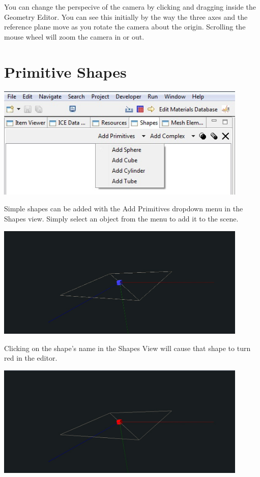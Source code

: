 You can change the perspecive of the camera by clicking and dragging inside the
Geometry Editor. You can see this initially by the way the three axes and the
reference plane move as you rotate the camera about the origin. Scrolling the
mouse wheel will zoom the camera in or out.

\section{Primitive Shapes}

\begin{center}
\includegraphics[width=12cm]{images/GeometryAddPrimitive.jpg}
\end{center}

Simple shapes can be added with the Add Primitives dropdown menu in the Shapes
view. Simply select an object from the menu to add it to the scene.

\begin{center}
\includegraphics[width=12cm]{images/GeometryAddCube.jpg}
\end{center}

Clicking on the shape's name in the Shapes View will cause that shape to turn
red in the editor.

\begin{center}
\includegraphics[width=12cm]{images/GeometrySelectCube.jpg}
\end{center}

